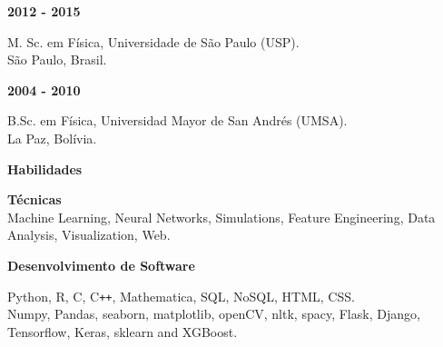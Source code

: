 \documentclass[a4paper,12pt,final]{memoir}
\newcommand{\SmallSep}{\vspace{0.5em}}
\newcommand{\CVSection}[1]
	{\Large\textbf{#1}\par
	\SmallSep\normalsize\normalfont}
\newcommand{\CVItem}[1]
	{\textbf{\color{RoyalBlue} #1}}
\begin{document}
\CVItem{2012 - 2015}\\
\begin{small}
M. Sc. em Física, Universidade de S\~{a}o Paulo (USP).\\
S\~{a}o Paulo, Brasil.
\end{small}
\SmallSep

\CVItem{2004 - 2010}\\
\begin{small}
B.Sc. em Física, Universidad Mayor de San Andr\'{e}s (UMSA).\\
La Paz, Bolívia.
\end{small}

\SmallSep

\CVSection{Habilidades}


\CVItem{Técnicas}\\
{\small Machine Learning, Neural Networks, Simulations, Feature Engineering, Data Analysis, Visualization, Web.\\}
\vspace{-10pt}
\SmallSep

\CVItem{Desenvolvimento de Software}\\
\begin{small}
Python, R, C, C\texttt{++}, Mathematica, SQL, NoSQL, HTML, CSS.\\
Numpy, Pandas, seaborn, matplotlib, openCV, nltk, spacy, Flask, Django, Tensorflow, Keras, sklearn and XGBoost.\\
\end{small}





\end{document}
